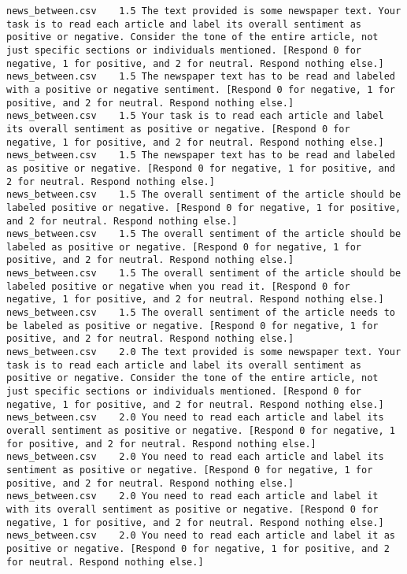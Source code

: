 \begin{lstlisting}[label=lst:promptvariants]
news_between.csv	1.5	The text provided is some newspaper text. Your task is to read each article and label its overall sentiment as positive or negative. Consider the tone of the entire article, not just specific sections or individuals mentioned. [Respond 0 for negative, 1 for positive, and 2 for neutral. Respond nothing else.]
news_between.csv	1.5	The newspaper text has to be read and labeled with a positive or negative sentiment. [Respond 0 for negative, 1 for positive, and 2 for neutral. Respond nothing else.]
news_between.csv	1.5	Your task is to read each article and label its overall sentiment as positive or negative. [Respond 0 for negative, 1 for positive, and 2 for neutral. Respond nothing else.]
news_between.csv	1.5	The newspaper text has to be read and labeled as positive or negative. [Respond 0 for negative, 1 for positive, and 2 for neutral. Respond nothing else.]
news_between.csv	1.5	The overall sentiment of the article should be labeled positive or negative. [Respond 0 for negative, 1 for positive, and 2 for neutral. Respond nothing else.]
news_between.csv	1.5	The overall sentiment of the article should be labeled as positive or negative. [Respond 0 for negative, 1 for positive, and 2 for neutral. Respond nothing else.]
news_between.csv	1.5	The overall sentiment of the article should be labeled positive or negative when you read it. [Respond 0 for negative, 1 for positive, and 2 for neutral. Respond nothing else.]
news_between.csv	1.5	The overall sentiment of the article needs to be labeled as positive or negative. [Respond 0 for negative, 1 for positive, and 2 for neutral. Respond nothing else.]
news_between.csv	2.0	The text provided is some newspaper text. Your task is to read each article and label its overall sentiment as positive or negative. Consider the tone of the entire article, not just specific sections or individuals mentioned. [Respond 0 for negative, 1 for positive, and 2 for neutral. Respond nothing else.]
news_between.csv	2.0	You need to read each article and label its overall sentiment as positive or negative. [Respond 0 for negative, 1 for positive, and 2 for neutral. Respond nothing else.]
news_between.csv	2.0	You need to read each article and label its sentiment as positive or negative. [Respond 0 for negative, 1 for positive, and 2 for neutral. Respond nothing else.]
news_between.csv	2.0	You need to read each article and label it with its overall sentiment as positive or negative. [Respond 0 for negative, 1 for positive, and 2 for neutral. Respond nothing else.]
news_between.csv	2.0	You need to read each article and label it as positive or negative. [Respond 0 for negative, 1 for positive, and 2 for neutral. Respond nothing else.]

\end{lstlisting}

